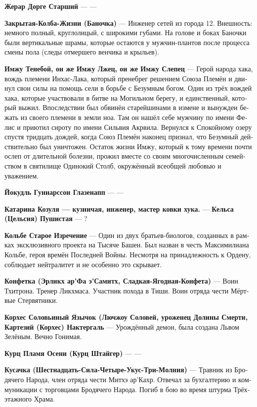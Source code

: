 \documentclass[a4paper,12pt,fleqn]{book}\usepackage{polyglossia}\setdefaultlanguage[babelshorthands=true]{russian}\setotherlanguage{english}\defaultfontfeatures{Ligatures=TeX,Mapping=tex-text}\usepackage{xcolor}\newcommand{\ml}[3]{#2}
\newcommand{\theterm}[3]{\textbf{\hypertarget{#1}{#2}} --- #3}
\begin{document}
{\theterm{dourgue-senior} %
{Жерар Дорге Старший}
{---}

\theterm{flask} %
{Закрытая-Колба-Жизни (Баночка)}
{Инженер сетей из города 12.
Внешность: немного полный, круглолицый, с широкими губами.
На голове и боках Баночки были вертикальные шрамы, которые остаются у мужчин-плантов после процесса смены пола (следы отмершего венчика и крыльев).}

\theterm{imzhu}
{Имжу Тенебой, он же Имжу Лжец, он же Имжу Слепец}
{Герой народа хака, вождь племени Инхас-Лака, который пренебрег решением Союза Племён и двинул свои силы на помощь сели в борьбе с Безумным богом.
Один из трёх вождей хака, которые участвовали в битве на Могильном берегу, и единственный, который выжил.
Впоследствии был обвинён старейшинами в измене и вынужден бежать из своего племени в земли ноа.
Там он нашёл себе мужчину по имени Фелис и приютил сироту по имени Сильвия Акрвила.
Вернулся к Спокойному озеру спустя тридцать дождей, когда Союз Племён наконец признал, что Безумный действительно был уничтожен.
Остаток жизни Имжу, который к тому времени почти ослеп от длительной болезни, прожил вместе со своим многочисленным семейством в святилище Одинокий Столб, окружённый всеобщей любовью и уважением.}

\theterm{jokull}
{Йокудль Гуннарссон Глазенапп}
{---}

\theterm{katarina} %
{Катарина Козуля --- кузничая, инженер, мастер ковки хука.}

\theterm{celsa}
{Кельса (Цельсия) Пушистая}
{?}

\theterm{colbe} %
{Кольбе Старое Изречение}
{Один из двух братьев-биологов, созданных в рамках эксклюзивного проекта на Тысяче Башен.
Был назван в честь Максимилиана Кольбе, героя времён Последней Войны.
Несмотря на принадлежность к Ордену, соблюдает нейтралитет и не особенно это скрывает.}

\theterm{candy} %
{Конфетка (Эрликх ар’Фа э’Самитх, Сладкая-Ягодная-Конфета)}
{Воин Тхитрона.
Тренер Ликхмаса.
Участник похода в Тиши.
Воин отряда чести Мёртвые Стервятники.}

\theterm{corjes}
{Корхес Соловьиный Язычок (Лючжоу Соловей, уроженец Долины Смерти, Картезий (Корхес) Нактергаль}
{Урождённый демон, была создана Львом Зелёным.
Вечно Гонимая.}

\theterm{kurz}
{Курц Пламя Осени (Курц Штайгер)}
{---}

\theterm{biter}
{Кусачка (Шестнадцать-Сила-Четыре-Укус-Три-Молния)}
{Травник из Бродячего Народа, член отряда чести Митхэ ар'Кахр.
Отвечал за бухгалтерию и коммуникации с торговцами Бродячего Народа.
Погиб в бою во время штурма Трёхэтажного Храма.}

}
\end{document}
